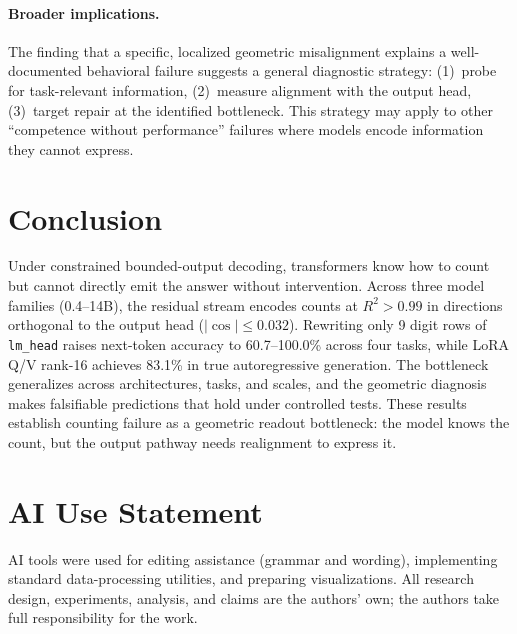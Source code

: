 \documentclass{article}
\begin{document}
\paragraph{Broader implications.}
The finding that a specific, localized geometric misalignment explains a
well-documented behavioral failure suggests a general diagnostic strategy:
(1)~probe for task-relevant information, (2)~measure alignment with the output
head, (3)~target repair at the identified bottleneck. This strategy may apply
to other ``competence without performance'' failures where models encode
information they cannot express.

\section{Conclusion}

Under constrained bounded-output decoding, transformers know how to count but
cannot directly emit the answer without intervention. Across three model
families (0.4--14B), the residual stream encodes counts at $R^2>0.99$ in
directions orthogonal to the output head ($|\cos| \leq 0.032$). Rewriting only
9 digit rows of \texttt{lm\_head} raises next-token accuracy to 60.7--100.0\%
across four tasks, while LoRA Q/V rank-16 achieves 83.1\% in true
autoregressive generation. The bottleneck generalizes across architectures,
tasks, and scales, and the geometric diagnosis makes falsifiable predictions
that hold under controlled tests. These results establish counting failure as a
geometric readout bottleneck: the model knows the count, but the output pathway
needs realignment to express it.

\section*{AI Use Statement}
AI tools were used for editing assistance (grammar and wording), implementing standard data-processing utilities, and preparing visualizations. All research design, experiments, analysis, and claims are the authors' own; the authors take full responsibility for the work.




\appendix
\end{document}
